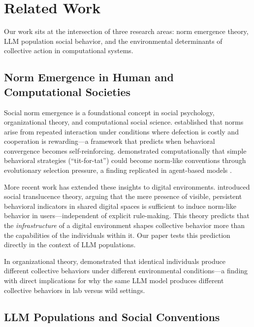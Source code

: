 \section{Related Work}
\label{sec:related}

Our work sits at the intersection of three research areas: norm emergence theory, LLM population social behavior, and the environmental determinants of collective action in computational systems.

\subsection{Norm Emergence in Human and Computational Societies}
\label{sec:norms-human}

Social norm emergence is a foundational concept in social psychology, organizational theory, and computational social science.  established that norms arise from repeated interaction under conditions where defection is costly and cooperation is rewarding—a framework that predicts when behavioral convergence becomes self-reinforcing.  demonstrated computationally that simple behavioral strategies (``tit-for-tat'') could become norm-like conventions through evolutionary selection pressure, a finding replicated in agent-based models \citep{epstein1998learning}.

More recent work has extended these insights to digital environments.  introduced social translucence theory, arguing that the mere presence of visible, persistent behavioral indicators in shared digital spaces is sufficient to induce norm-like behavior in users—independent of explicit rule-making. This theory predicts that the \emph{infrastructure} of a digital environment shapes collective behavior more than the capabilities of the individuals within it. Our paper tests this prediction directly in the context of LLM populations.

In organizational theory,  demonstrated that identical individuals produce different collective behaviors under different environmental conditions—a finding with direct implications for why the same LLM model produces different collective behaviors in lab versus wild settings.

\subsection{LLM Populations and Social Conventions}
\label{sec:norms-llm}

